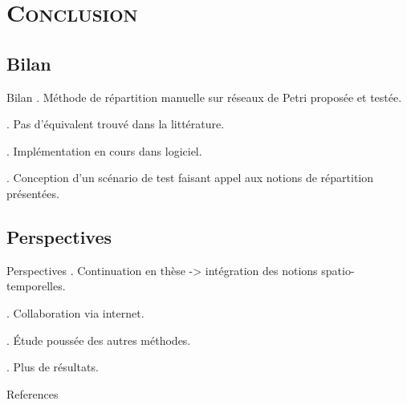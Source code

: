 
\section{\scshape Conclusion}
\subsection*{Bilan}
\begin{frame}{Bilan}
	. Méthode de répartition manuelle sur réseaux de Petri proposée et testée.
	
	. Pas d'équivalent trouvé dans la littérature.
	
	. Implémentation en cours dans logiciel.
	
	. Conception d'un scénario de test faisant appel aux notions de répartition présentées.
	
\end{frame}

\subsection*{Perspectives}
\begin{frame}{Perspectives}
	. Continuation en thèse -> intégration des notions spatio-temporelles.
		
	. Collaboration via internet.
		
	. Étude poussée des autres méthodes.
		
	. Plus de résultats.
\end{frame}


{\small
\begin{frame}[allowframebreaks]{References}
	
	
	
	
\end{frame}
}